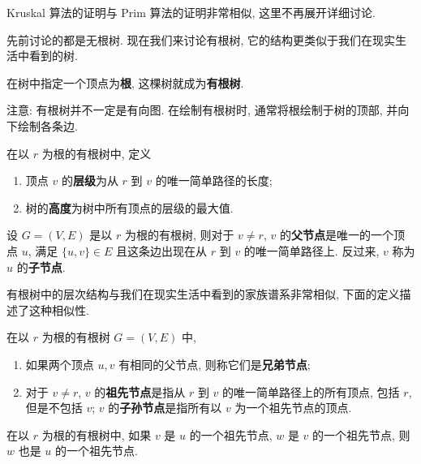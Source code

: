 Kruskal 算法的证明与 Prim 算法的证明非常相似, 这里不再展开详细讨论.

先前讨论的都是无根树. 现在我们来讨论有根树, 它的结构更类似于我们在现实生活中看到的树.

\begin{definition}[有根树]
    在树中指定一个顶点为\textbf{根}, 这棵树就成为\textbf{有根树}.
\end{definition}

注意: 有根树并不一定是有向图. 在绘制有根树时, 通常将根绘制于树的顶部, 并向下绘制各条边. 

\begin{definition}
    在以 $r$ 为根的有根树中, 定义
    \begin{enumerate}[itemindent=0ex, itemsep=0pt, label=\upshape{(\alph*)}]
        \item 顶点 $v$ 的\textbf{层级}为从 $r$ 到 $v$ 的唯一简单路径的长度;
        \item 树的\textbf{高度}为树中所有顶点的层级的最大值.
    \end{enumerate}
\end{definition}

\begin{definition}
    设 $G=(V,E)$ 是以 $r$ 为根的有根树, 则对于 $v\neq r$, $v$ 的\textbf{父节点}是唯一的一个顶点 $u$, 满足 $\{u,v\}\in E$ 且这条边出现在从 $r$ 到 $v$ 的唯一简单路径上. 反过来, $v$ 称为 $u$ 的\textbf{子节点}.
\end{definition}

有根树中的层次结构与我们在现实生活中看到的家族谱系非常相似, 下面的定义描述了这种相似性.

\begin{definition}
    在以 $r$ 为根的有根树 $G=(V,E)$ 中, 
    \begin{enumerate}[itemindent=0ex, itemsep=0pt, label=\upshape{(\alph*)}]
        \item 如果两个顶点 $u,v$ 有相同的父节点, 则称它们是\textbf{兄弟节点};
        \item 对于 $v\neq r$, $v$ 的\textbf{祖先节点}是指从 $r$ 到 $v$ 的唯一简单路径上的所有顶点, 包括 $r$, 但是不包括 $v$; $v$ 的\textbf{子孙节点}是指所有以 $v$ 为一个祖先节点的顶点.
    \end{enumerate}
\end{definition}

\begin{theorem}
    在以 $r$ 为根的有根树中, 如果 $v$ 是 $u$ 的一个祖先节点, $w$ 是 $v$ 的一个祖先节点, 则 $w$ 也是 $u$ 的一个祖先节点.
\end{theorem}

